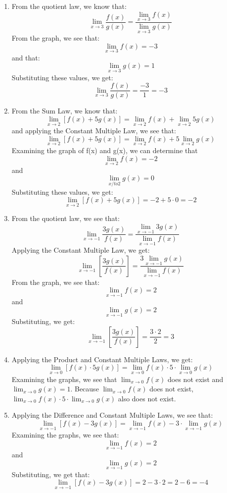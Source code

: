 \begin{Answer}
    [ref=limits6]
    \begin{enumerate}
        \item From the quotient law, we know that:$$\lim_{x\to3}\frac{f(x)}{g(x)}=\frac{\lim_{x\to3}f(x)}{\lim_{x\to3}g(x)}$$ From the graph, we see that: $$\lim_{x\to3}f(x) = -3$$ and that:$$\lim_{x\to3}g(x) = 1$$ Substituting these values, we get: $$\lim_{x\to3}\frac{f(x)}{g(x)}=\frac{-3}{1} = -3$$
        \item From the Sum Law, we know that: $$\lim_{x\to2}\left[f(x) + 5g(x)\right]=\lim_{x\to2}f(x) + \lim_{x\to2}5g(x)$$ and applying the Constant Multiple Law, we see that: $$\lim_{x\to2}\left[f(x) + 5g(x)\right]=\lim_{x\to2}f(x) + 5\lim_{x\to2}g(x)$$ Examining the graph of f(x) and g(x), we can determine that $$\lim_{x\to2}f(x) = -2$$ and $$\lim_{x/to2}g(x) = 0$$ Substituting these values, we get: $$\lim_{x\to2}\left[f(x) + 5g(x)\right]=-2 + 5 \cdot 0 = -2$$
        \item From the quotient law, we see that: $$\lim_{x\to-1} \frac{3g(x)}{f(x)}=\frac{\lim_{x\to-1}3g(x)}{\lim_{x\to-1}f(x)}$$ Applying the Constant Multiple Law, we get: $$\lim_{x\to-1} \left[\frac{3g(x)}{f(x)}\right]=\frac{3\lim_{x\to-1}g(x)}{\lim_{x\to-1}f(x)}$$ From the graph, we see that: $$\lim_{x\to-1}f(x) = 2$$ and $$\lim_{x\to-1}g(x) = 2$$ Substituting, we get: $$\lim_{x\to-1} \left[\frac{3g(x)}{f(x)}\right]=\frac{3 \cdot 2}{2}=3$$
        \item Applying the Product and Constant Multiple Laws, we get: $$\lim_{x\to0}\left[f(x) \cdot 5g(x)\right] = \lim_{x\to0}f(x) \cdot 5 \cdot \lim_{x\to0}g(x)$$ Examining the graphs, we see that $\lim_{x\to0}f(x)$ does not exist and $\lim_{x\to0}g(x) = 1$. Because $\lim_{x\to0}f(x)$ does not exist, $\lim_{x\to0}f(x) \cdot 5 \cdot \lim_{x\to0}g(x)$ also does not exist. 
        \item Applying the Difference and Constant Multiple Laws, we see that: $$\lim_{x\to-1} \left[f(x) - 3g(x)\right] =\lim_{x\to-1}f(x) - 3 \cdot \lim_{x\to-1}g(x)$$ Examining the graphs, we see that: $$\lim_{x\to-1}f(x) = 2$$ and $$\lim_{x\to-1}g(x) = 2$$ Substituting, we get that: $$\lim_{x\to-1} \left[f(x) - 3g(x)\right] =2 - 3 \cdot 2 = 2-6 = -4$$
    \end{enumerate}
\end{Answer}


